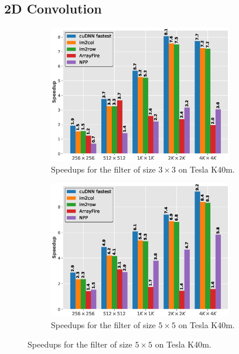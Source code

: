\documentclass[sigplan,review,anonymous]{acmart}\settopmatter{printfolios=true,printccs=false,printacmref=false}
\begin{document}
\subsection{2D Convolution}
\begin{figure}
\begin{subfigure}{\columnwidth}
		\centering
		 \includegraphics[width=\columnwidth,height=6cm]{./figure/2d_norm_f3.eps}
		 \caption{Speedups for the filter of size $3 \times 3$ on Tesla K40m.}
		 \label{fig:2druntimef3c1}
	\end{subfigure}
	\begin{subfigure}{\columnwidth}
		\centering
		 \includegraphics[width=\columnwidth,height=6cm]{./figure/2d_norm_f5.eps}
		 \caption{Speedups for the filter of size $5 \times 5$ on Tesla K40m.}
		 \label{fig:2druntimef5c1}
	\end{subfigure}
	

\end{figure}
\end{document}
